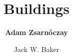%
%
%


%
%
%
%
%
%
%
%

\title{Buildings}
\author{
    \textbf{Adam Zsarnóczay}
    \and Jack W. Baker}
\tocauthor{}
%
%
\maketitle
\label{chapter:perf_bldg}

